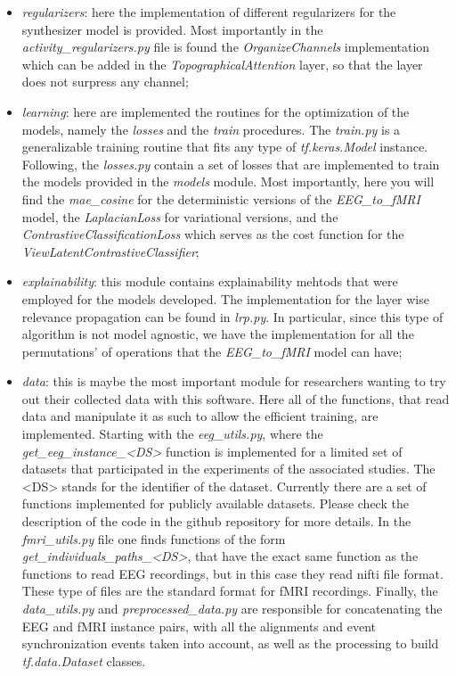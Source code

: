 \begin{itemize}
    \item \textit{regularizers}: here the implementation of different regularizers for the synthesizer model is provided. Most importantly in the \textit{activity\_regularizers.py} file is found the \textit{OrganizeChannels} implementation which can be added in the \textit{TopographicalAttention} layer, so that the layer does not surpress any channel;
    \item \textit{learning}: here are implemented the routines for the optimization of the models, namely the \textit{losses} and the \textit{train} procedures. The \textit{train.py} is a generalizable training routine that fits any type of \textit{tf.keras.Model} instance. Following, the \textit{losses.py} contain a set of losses that are implemented to train the models provided in the \textit{models} module. Most importantly, here you will find the \textit{mae\_cosine} for the deterministic versions of the \textit{EEG\_to\_fMRI} model, the \textit{LaplacianLoss} for variational versions, and the \textit{ContrastiveClassificationLoss} which serves as the cost function for the \textit{ViewLatentContrastiveClassifier}; 
    \item \textit{explainability}: this module contains explainability mehtods that were employed for the models developed. The implementation for the layer wise relevance propagation \cite{bach2015pixel} can be found in \textit{lrp.py}. In particular, since this type of algorithm is not model agnostic, we have the implementation for all the permutations' of operations that the \textit{EEG\_to\_fMRI} model can have;
    \item \textit{data}: this is maybe the most important module for researchers wanting to try out their collected data with this software. Here all of the functions, that read data and manipulate it as such to allow the efficient training, are implemented. Starting with the \textit{eeg\_utils.py}, where the \textit{get\_eeg\_instance\_<DS>} function is implemented for a limited set of datasets that participated in the experiments of the associated studies. The <DS> stands for the identifier of the dataset. Currently there are a set of functions implemented for publicly available datasets. Please check the description of the code in the github repository for more details. In the \textit{fmri\_utils.py} file one finds functions of the form \textit{get\_individuals\_paths\_<DS>}, that have the exact same function as the functions to read EEG recordings, but in this case they read nifti file format. These type of files are the standard format for fMRI recordings. Finally, the \textit{data\_utils.py} and \textit{preprocessed\_data.py} are responsible for concatenating the EEG and fMRI instance pairs, with all the alignments and event synchronization events taken into account, as well as the processing to build \textit{tf.data.Dataset} classes.

\end{itemize}
